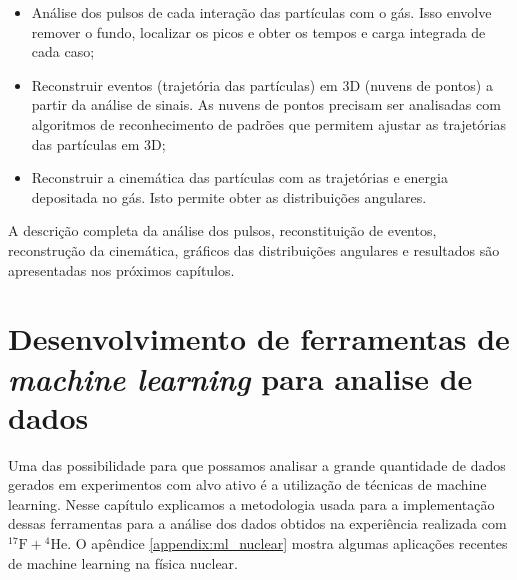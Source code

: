\documentclass[a4paper,12pt,oneside]{book}
\begin{document}
\begin{itemize}
    \item Análise dos pulsos de cada interação das partículas com o gás. Isso envolve remover o fundo, localizar os picos e obter os tempos e carga integrada de cada caso;
    \item Reconstruir eventos (trajetória das partículas) em 3D (nuvens de pontos) a partir da análise de sinais. As nuvens de pontos precisam ser analisadas com algoritmos de reconhecimento de padrões que permitem ajustar as trajetórias das partículas em 3D;
    \item Reconstruir a cinemática das partículas com as trajetórias e energia depositada no gás. Isto permite obter as distribuições angulares. 
\end{itemize}


\par A descrição completa da análise dos pulsos, reconstituição de eventos, reconstrução da cinemática, gráficos das distribuições angulares e resultados são apresentadas nos próximos capítulos.

\chapter{Desenvolvimento de ferramentas de \textit{machine learning} para analise de dados}\label{sec:ml}

\par Uma das possibilidade para que possamos analisar a grande quantidade de dados gerados em experimentos com alvo ativo é a utilização de técnicas de machine learning. Nesse capítulo explicamos a metodologia usada para a implementação dessas ferramentas para a análise dos dados obtidos na experiência realizada com ${}^{17}\text{F}+{}^{4}\text{He}$. O apêndice \ref{appendix:ml_nuclear} mostra algumas aplicações recentes de machine learning na física nuclear.
\end{document}
